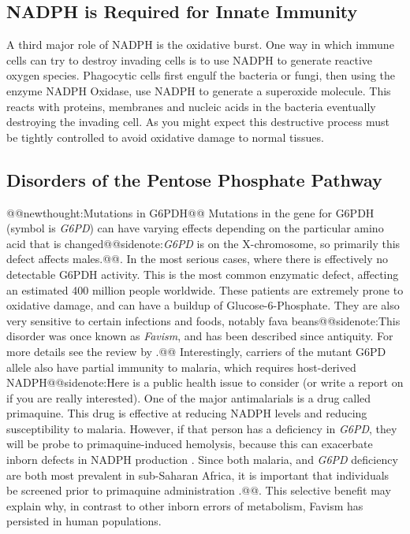 \documentclass{tufte-handout}
\makeatletter
\def\newthought#1{@@newthought:#1@@}
\def\sidenote#1{@@sidenote:#1@@}
\makeatother
\begin{document}
\subsection{NADPH is Required for Innate Immunity}

A third major role of NADPH is the oxidative burst.  One way in which immune cells can try to destroy invading cells is to use NADPH  to generate reactive oxygen species.  Phagocytic cells first engulf the bacteria or fungi, then using the enzyme NADPH Oxidase, use NADPH to generate a superoxide molecule.  This reacts with proteins, membranes and nucleic acids in the bacteria eventually destroying the invading cell.  As you might expect this destructive process must be tightly controlled to avoid oxidative damage to normal tissues.

\subsection{Disorders of the Pentose Phosphate Pathway}

\newthought{Mutations in G6PDH}
Mutations in the gene for G6PDH (symbol is \textit{G6PD}) can have varying effects depending on the particular amino acid that is changed\sidenote{\textit{G6PD} is on the X-chromosome, so primarily this defect affects males.}.  In the most serious cases, where there is effectively no detectable G6PDH activity.  This is the most common enzymatic defect, affecting an estimated 400 million people worldwide.  These patients are extremely prone to oxidative damage, and can have a buildup of Glucose-6-Phosphate.  They are also very sensitive to certain infections and foods, notably fava beans\sidenote{This disorder was once known as \emph{Favism}\index{Diseases!Favism}, and has been described since antiquity.  For more details see the review by \citet{Luzzatto2018}.}  Interestingly, carriers of the mutant G6PD allele also have partial immunity to malaria, which requires host-derived NADPH\sidenote{Here is a public health issue to consider (or write a report on if you are really interested).  One of the major antimalarials is a drug called primaquine.  This drug is effective at reducing NADPH levels and reducing susceptibility to malaria.  However, if that person has a deficiency in \textit{G6PD}, they will be probe to primaquine-induced hemolysis, because this can exacerbate inborn defects in NADPH production \citep{Chatterjea1961}.  Since both malaria, and \textit{G6PD} deficiency are both most prevalent in sub-Saharan Africa, it is important that individuals be screened prior to primaquine administration \citep{Howes2013}.}.  This selective benefit may explain why, in contrast to other inborn errors of metabolism, Favism has persisted in human populations.
\end{document}
